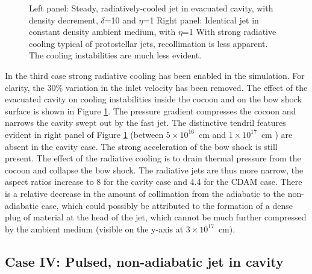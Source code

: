 \begin{figure}[t]
\begin{center}
\begin{minipage}[t]{.48\linewidth}
   \end{minipage} \hfill
\hfill
\caption{
Left panel:
Steady, radiatively-cooled jet in evacuated cavity, with density decrement, $\delta$=10 and $\eta$=1
Right panel: 
Identical jet in constant density ambient medium, with $\eta$=1
With strong radiative cooling typical of protostellar jets, recollimation is less apparent.
The cooling instabilities are much less evident.
}
\label{fig:flash:cool}       %
\end{center}
\end{figure}


In the third case strong radiative cooling has been enabled in the simulation.
For clarity, the 30\% variation in the inlet velocity has been removed.
The effect of the evacuated cavity on cooling instabilities inside the cocoon and on the bow shock surface is shown in Figure \ref{fig:flash:cool}.
The pressure gradient compresses the cocoon and narrows the cavity swept out by the fast jet.
The distinctive tendril features evident in right panel of Figure \ref{fig:flash:cool} (between $5\times10^{16}$~cm and $1\times10^{17}$~cm ) are absent in the cavity case.
The strong acceleration of the bow shock is still present.
The effect of the radiative cooling is to drain thermal pressure from the cocoon and collapse the bow shock.
The radiative jets are thus more narrow, the aspect ratios increase to 8 for the cavity case and 4.4 for the CDAM case.
There is a relative decrease in the amount of collimation from the adiabatic to the non-adiabatic case, which could possibly be attributed to the formation of a dense plug of material at the head of the jet, which cannot be much further compressed by the ambient medium 
(visible on the y-axis at $3\times10^{17}$~cm).




\subsection{Case IV: Pulsed, non-adiabatic jet in cavity}


